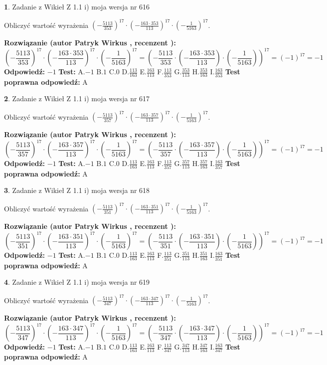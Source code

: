 \documentclass[12pt, a4paper]{article}
\theoremstyle{definition} %
\newtheorem{zad}{}
\newcommand{\zadStart}[1]{\begin{zad}#1\newline}
\newcommand{\zadStop}{\end{zad}}
\newcommand{\rozwStart}[2]{\noindent \textbf{Rozwiązanie (autor #1 , recenzent #2): }\newline}
\newcommand{\rozwStop}{\newline}
\newcommand{\odpStart}{\noindent \textbf{Odpowiedź:}\newline}
\newcommand{\odpStop}{\newline}
\newcommand{\testStart}{\noindent \textbf{Test:}\newline}
\newcommand{\testStop}{\newline}
\newcommand{\kluczStart}{\noindent \textbf{Test poprawna odpowiedź:}\newline}
\newcommand{\kluczStop}{\newline}
\begin{document}
\zadStart{Zadanie z Wikieł Z 1.1 i) moja wersja nr 616}

Obliczyć wartość wyrażenia $(-\frac{5113}{353})^{17} \cdot (-\frac{163 \cdot 353}{113})^{17} \cdot (-\frac{1}{5163})^{17}$.
\zadStop
\rozwStart{Patryk Wirkus}{}
$$(-\frac{5113}{353})^{17} \cdot (-\frac{163 \cdot 353}{113})^{17} \cdot (-\frac{1}{5163})^{17} = (-\frac{5113}{353} \cdot (-\frac{163 \cdot 353}{113}) \cdot (-\frac{1}{5163}))^{17} = (-1)^{17} = -1$$
\rozwStop
\odpStart
$-1$
\odpStop
\testStart
A.$-1$ B.$1$ C.$0$ D.$\frac{113}{163}$ E.$\frac{163}{113}$
F.$\frac{113}{353}$ G.$\frac{353}{113}$
H.$\frac{353}{163}$
I.$\frac{163}{353}$
\testStop
\kluczStart
A
\kluczStop



\zadStart{Zadanie z Wikieł Z 1.1 i) moja wersja nr 617}

Obliczyć wartość wyrażenia $(-\frac{5113}{357})^{17} \cdot (-\frac{163 \cdot 357}{113})^{17} \cdot (-\frac{1}{5163})^{17}$.
\zadStop
\rozwStart{Patryk Wirkus}{}
$$(-\frac{5113}{357})^{17} \cdot (-\frac{163 \cdot 357}{113})^{17} \cdot (-\frac{1}{5163})^{17} = (-\frac{5113}{357} \cdot (-\frac{163 \cdot 357}{113}) \cdot (-\frac{1}{5163}))^{17} = (-1)^{17} = -1$$
\rozwStop
\odpStart
$-1$
\odpStop
\testStart
A.$-1$ B.$1$ C.$0$ D.$\frac{113}{163}$ E.$\frac{163}{113}$
F.$\frac{113}{357}$ G.$\frac{357}{113}$
H.$\frac{357}{163}$
I.$\frac{163}{357}$
\testStop
\kluczStart
A
\kluczStop



\zadStart{Zadanie z Wikieł Z 1.1 i) moja wersja nr 618}

Obliczyć wartość wyrażenia $(-\frac{5113}{351})^{17} \cdot (-\frac{163 \cdot 351}{113})^{17} \cdot (-\frac{1}{5163})^{17}$.
\zadStop
\rozwStart{Patryk Wirkus}{}
$$(-\frac{5113}{351})^{17} \cdot (-\frac{163 \cdot 351}{113})^{17} \cdot (-\frac{1}{5163})^{17} = (-\frac{5113}{351} \cdot (-\frac{163 \cdot 351}{113}) \cdot (-\frac{1}{5163}))^{17} = (-1)^{17} = -1$$
\rozwStop
\odpStart
$-1$
\odpStop
\testStart
A.$-1$ B.$1$ C.$0$ D.$\frac{113}{163}$ E.$\frac{163}{113}$
F.$\frac{113}{351}$ G.$\frac{351}{113}$
H.$\frac{351}{163}$
I.$\frac{163}{351}$
\testStop
\kluczStart
A
\kluczStop



\zadStart{Zadanie z Wikieł Z 1.1 i) moja wersja nr 619}

Obliczyć wartość wyrażenia $(-\frac{5113}{347})^{17} \cdot (-\frac{163 \cdot 347}{113})^{17} \cdot (-\frac{1}{5163})^{17}$.
\zadStop
\rozwStart{Patryk Wirkus}{}
$$(-\frac{5113}{347})^{17} \cdot (-\frac{163 \cdot 347}{113})^{17} \cdot (-\frac{1}{5163})^{17} = (-\frac{5113}{347} \cdot (-\frac{163 \cdot 347}{113}) \cdot (-\frac{1}{5163}))^{17} = (-1)^{17} = -1$$
\rozwStop
\odpStart
$-1$
\odpStop
\testStart
A.$-1$ B.$1$ C.$0$ D.$\frac{113}{163}$ E.$\frac{163}{113}$
F.$\frac{113}{347}$ G.$\frac{347}{113}$
H.$\frac{347}{163}$
I.$\frac{163}{347}$
\testStop
\kluczStart
A
\kluczStop
\end{document}
